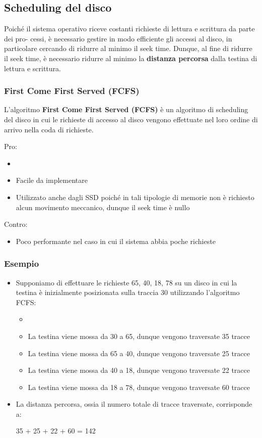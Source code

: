 \documentclass{article}
\begin{document}
\subsection{Scheduling del disco}
Poiché il sistema operativo riceve costanti richieste di lettura e scrittura da parte dei pro- cessi, è necessario gestire in modo efficiente gli accessi al disco, in particolare cercando di ridurre al minimo il seek time. Dunque, al fine di ridurre il seek time, è necessario ridurre al minimo la \textbf{distanza percorsa} dalla testina di lettura e scrittura.

\subsubsection{First Come First Served (FCFS)}
L'algoritmo \textbf{First Come First Served (FCFS)} è un algoritmo di scheduling del disco in cui le richieste di accesso al disco vengono effettuate nel loro ordine di arrivo nella coda di richieste.\par
Pro:
\begin{itemize}
    \item 
    \item Facile da implementare
    \item Utilizzato anche dagli SSD poiché in tali tipologie di memorie non è richiesto alcun movimento meccanico, dunque il seek time è nullo
\end{itemize}
Contro:
\begin{itemize}
    \item Poco performante nel caso in cui il sistema abbia poche richieste
\end{itemize}
\subsubsection{Esempio}
\begin{itemize}
    \item Supponiamo di effettuare le richieste 65, 40, 18, 78 su un disco in cui la testina è inizialmente posizionata sulla traccia 30 utilizzando l'algoritmo FCFS:
    \begin{itemize}
        \item 
        \item La testina viene mossa da 30 a 65, dunque vengono traversate 35 tracce 
        \item La testina viene mossa da 65 a 40, dunque vengono traversate 25 tracce 
        \item La testina viene mossa da 40 a 18, dunque vengono traversate 22 tracce 
        \item La testina viene mossa da 18 a 78, dunque vengono traversate 60 tracce
    \end{itemize}
    \item La distanza percorsa, ossia il numero totale di tracce traversate, corrisponde a:
    \begin{center}
        35 + 25 + 22 + 60 = 142
    \end{center}
\end{itemize}
\end{document}
